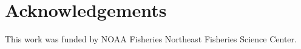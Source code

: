 \documentclass[
  12pt,
]{article}
\newlength{\cslhangindent}
\newlength{\cslentryspacingunit} %
\newenvironment{CSLReferences}[2] %
 {%
  \setlength{\parindent}{0pt}
  \ifodd #1
  \let\oldpar\par
  \def\par{\hangindent=\cslhangindent\oldpar}
  \fi
  \setlength{\parskip}{#2\cslentryspacingunit}
 }%
 {}
\begin{document}
\hypertarget{acknowledgements}{%
\section*{Acknowledgements}\label{acknowledgements}}

This work was funded by NOAA Fisheries Northeast Fisheries Science
Center.

\pagebreak



\hypertarget{refs}{}
\begin{CSLReferences}{0}{0}
\end{CSLReferences}

\pagebreak

\clearpage
\end{document}
